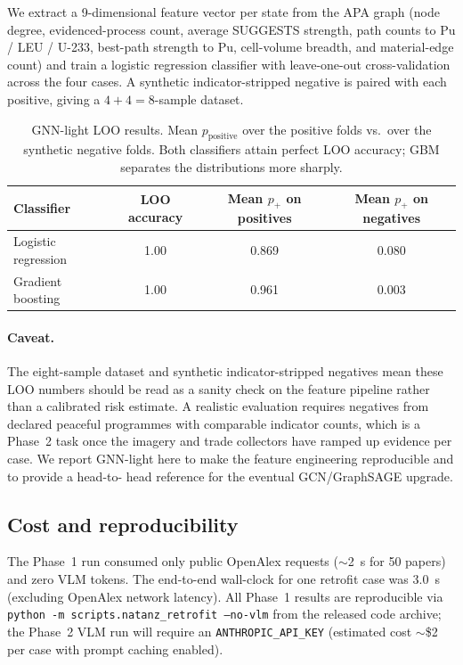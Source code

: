 \documentclass[11pt,a4paper]{article}
\begin{document}
We extract a 9-dimensional feature vector per state from the APA graph
(node degree, evidenced-process count, average SUGGESTS strength, path
counts to Pu / LEU / U-233, best-path strength to Pu, cell-volume
breadth, and material-edge count) and train a logistic regression
classifier with leave-one-out cross-validation across the four cases.
A synthetic indicator-stripped negative is paired with each positive,
giving a $4{+}4 = 8$-sample dataset.

\begin{table}[h]
  \centering
  \small
  \caption{GNN-light LOO results. Mean $p_{\text{positive}}$ over the
  positive folds vs.\ over the synthetic negative folds. Both
  classifiers attain perfect LOO accuracy; GBM separates the
  distributions more sharply.}
  \label{tab:gnnlite}
  \begin{tabular}{lccc}
  \toprule
  Classifier & LOO accuracy & Mean $p_+$ on positives & Mean $p_+$ on negatives \\
  \midrule
  Logistic regression & 1.00 & 0.869 & 0.080 \\
  Gradient boosting   & 1.00 & 0.961 & 0.003 \\
  \bottomrule
  \end{tabular}
\end{table}

\paragraph{Caveat.}
The eight-sample dataset and synthetic indicator-stripped negatives
mean these LOO numbers should be read as a sanity check on the feature
pipeline rather than a calibrated risk estimate. A realistic evaluation
requires negatives from declared peaceful programmes with comparable
indicator counts, which is a Phase~2 task once the imagery and trade
collectors have ramped up evidence per case. We report GNN-light here
to make the feature engineering reproducible and to provide a head-to-
head reference for the eventual GCN/GraphSAGE upgrade.

\subsection{Cost and reproducibility}
The Phase~1 run consumed only public OpenAlex requests ($\sim$2~s for
50 papers) and zero VLM tokens. The end-to-end wall-clock for one
retrofit case was 3.0~s (excluding OpenAlex network latency). All
Phase~1 results are reproducible via
\texttt{python -m scripts.natanz\_retrofit --no-vlm} from the released
code archive; the Phase~2 VLM run will require an
\texttt{ANTHROPIC\_API\_KEY} (estimated cost $\sim$\$2 per case
with prompt caching enabled).
\end{document}
